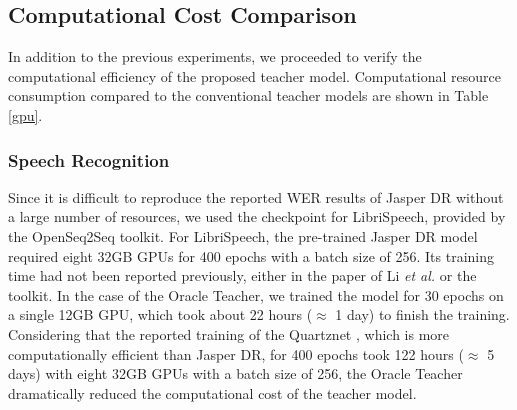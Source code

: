 \documentclass[journal]{IEEEtran}
\begin{document}






\subsection{Computational Cost Comparison} 
\label{computational cost section}
In addition to the previous experiments, we proceeded to verify the computational efficiency of the proposed teacher model. Computational resource consumption compared to the conventional teacher models are shown in Table \ref{gpu}.
\subsubsection{Speech Recognition}
Since it is difficult to reproduce the reported WER results of Jasper DR \cite{jasper:scheme} without a large number of resources, we used the checkpoint for LibriSpeech, provided by the OpenSeq2Seq \cite{openseq2seq} toolkit. 
For LibriSpeech, the pre-trained Jasper DR model required eight 32GB GPUs for 400 epochs with a batch size of 256. Its training time had not been reported previously, either in the paper of Li \textit{et al.} \cite{jasper:scheme} or the toolkit.
In the case of the Oracle Teacher, we trained the model for 30 epochs on a single 12GB GPU, which took about 22 hours ($\approx$ 1 day) to finish the training.
Considering that the reported training of the Quartznet \cite{quartznet:scheme}, which is more computationally efficient than Jasper DR, for 400 epochs took 122 hours ($\approx$ 5 days) with eight 32GB GPUs with a batch size of 256, the Oracle Teacher dramatically reduced the computational cost of the teacher model.
\end{document}
